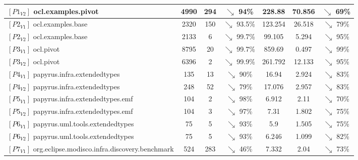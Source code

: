 \begin{table}
\begin{tabular}{lcccccc}
		$[P1_{V2}]$ ocl.examples.pivot & 4990 & 294 & \cellcolor{green!40}$\searrow$ 94\%  & 228.88  & 70.856 & \cellcolor{green!25}$\searrow$ 69\% \\ \midrule
		
		$[P2_{V1}]$ ocl.examples.base & 2320 & 150 & \cellcolor{green!40}$\searrow$ 93.5\%  & 123.254 & 26.518& \cellcolor{green!30}$\searrow$ 79\% \\ \midrule
		
		$[P2_{V2}]$ ocl.examples.base & 2133 & 6 & \cellcolor{green!40}$\searrow$ 99.7\%  & 99.105 & 5.294 & \cellcolor{green!40}$\searrow$ 95\% \\ \midrule
		
		
		$[P3_{V1}]$ ocl.pivot & 8795 & 20 & \cellcolor{green!40}$\searrow$ 99.7\%  &859.69 &  0.497& \cellcolor{green!40}$\searrow$ 99\% \\ \midrule
		
		$[P3_{V2}]$ ocl.pivot & 6396 & 2 & \cellcolor{green!40}$\searrow$ 99.9\%  & 261.792 & 12.133 & \cellcolor{green!40}$\searrow$ 95\% \\ \midrule
		
		$[P4_{V1}]$ papyrus.infra.extendedtypes & 135 & 13 & \cellcolor{green!40}$\searrow$ 90\%  &16.94 &  2.924& \cellcolor{green!35}$\searrow$ 83\% \\ \midrule
		
		$[P4_{V2}]$ papyrus.infra.extendedtypes & 248 & 52 & \cellcolor{green!30}$\searrow$ 79\%  & 17.076 & 2.957& \cellcolor{green!35}$\searrow$ 83\% \\\midrule
		
		$[P5_{V1}]$ papyrus.infra.extendedtypes.emf & 104 & 2 & \cellcolor{green!40}$\searrow$ 98\%  & 6.912& 2.11& \cellcolor{green!25}$\searrow$ 70\% \\ \midrule
		$[P5_{V2}]$ papyrus.infra.extendedtypes.emf & 104 & 3  & \cellcolor{green!40}$\searrow$ 97\%  & 7.31& 1.802 & \cellcolor{green!25}$\searrow$ 75\% \\ \midrule
		
		$[P6_{V1}]$ papyrus.uml.tools.extendedtypes & 75 & 5 & \cellcolor{green!40}$\searrow$ 93\%  &5.9 & 1.505 & \cellcolor{green!25}$\searrow$ 75\% \\ \midrule
		
		$[P6_{V2}]$ papyrus.uml.tools.extendedtypes & 75 & 5 &  \cellcolor{green!40}$\searrow$ 93\% & 6.246 & 1.099& \cellcolor{green!35}$\searrow$ 82\% \\ \midrule
		
		$[P7_{V1}]$ org.eclipse.modisco.infra.discovery.benchmark& 524 & 283 & \cellcolor{green!10}$\searrow$ 46\%  & 7.332 & 2.04 & \cellcolor{green!25}$\searrow$ 73\%  \\ \midrule
		

\end{tabular}
\end{table}
